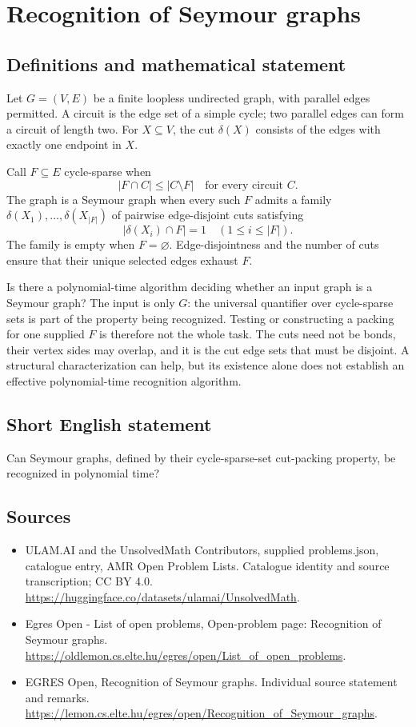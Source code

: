 \documentclass[11pt,a4paper]{article}
\begin{document}
\section*{Recognition of Seymour graphs}\label{statement}

\subsection{Definitions and mathematical statement}
Let $G=(V,E)$ be a finite loopless undirected graph, with parallel
edges permitted. A circuit is the edge set of a simple cycle;
two parallel edges can form a circuit of length two.
For $X\subseteq V$, the cut $\delta(X)$ consists of the edges
with exactly one endpoint in $X$.

Call $F\subseteq E$ cycle-sparse when
\[
                   |F\cap C|\le|C\setminus F|
                         \quad\text{for every circuit }C.
\]
The graph is a Seymour graph when every such $F$ admits a family
$\delta(X_1),\ldots,\delta(X_{|F|})$ of pairwise edge-disjoint cuts
satisfying
\[
                       |\delta(X_i)\cap F|=1
                                      \quad(1\le i\le|F|).
\]
The family is empty when $F=\varnothing$. Edge-disjointness and the
number of cuts ensure that their unique selected edges exhaust $F$.

Is there a polynomial-time algorithm deciding whether an input graph
is a Seymour graph? The input is only $G$: the universal quantifier
over cycle-sparse sets is part of the property being recognized.
Testing or constructing a packing for one supplied $F$ is therefore
not the whole task. The cuts need not be bonds, their vertex sides
may overlap, and it is the cut edge sets that must be disjoint.
A structural characterization can help, but its existence alone does
not establish an effective polynomial-time recognition algorithm.
\subsection{Short English statement}
Can Seymour graphs, defined by their cycle-sparse-set cut-packing property, be recognized in polynomial time?
\subsection{Sources}
\begin{itemize}
\item[S1] ULAM.AI and the UnsolvedMath Contributors, supplied problems.json, catalogue entry, AMR Open Problem Lists. Catalogue identity and source transcription; CC BY 4.0.
\url{https://huggingface.co/datasets/ulamai/UnsolvedMath}.
\item[S2] Egres Open - List of open problems, Open-problem page: Recognition of Seymour graphs. 
\url{https://oldlemon.cs.elte.hu/egres/open/List_of_open_problems}.
\item[S3] EGRES Open, Recognition of Seymour graphs. Individual source statement and remarks.
\url{https://lemon.cs.elte.hu/egres/open/Recognition_of_Seymour_graphs}.
\end{itemize}
\end{document}
